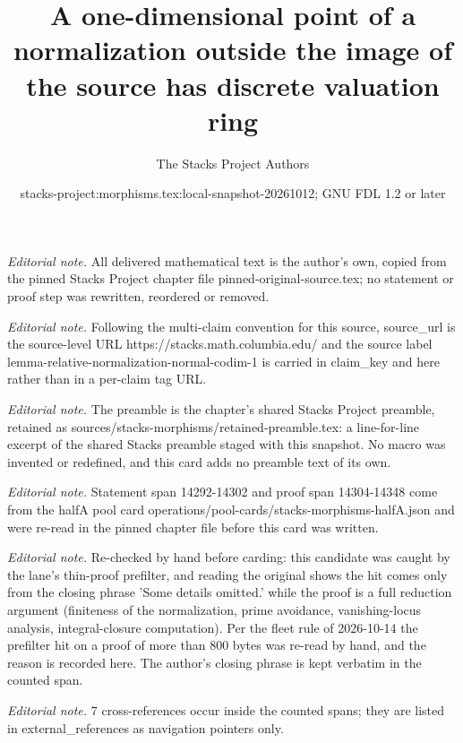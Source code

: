 \documentclass[10pt,a4paper]{amsart}
\title{A one-dimensional point of a normalization outside the image of the source has discrete valuation ring}
\author{The Stacks Project Authors}
\date{stacks-project:morphisms.tex:local-snapshot-20261012; GNU FDL 1.2 or later}
\theoremstyle{plain}
\theoremstyle{definition}
\theoremstyle{remark}
\numberwithin{equation}{subsection}
\begin{document}
\maketitle
\noindent\textit{Editorial note.} All delivered mathematical text is the author's own, copied from the pinned Stacks Project chapter file pinned-original-source.tex; no statement or proof step was rewritten, reordered or removed.\par\medskip
\noindent\textit{Editorial note.} Following the multi-claim convention for this source, source\_url is the source-level URL https://stacks.math.columbia.edu/ and the source label lemma-relative-normalization-normal-codim-1 is carried in claim\_key and here rather than in a per-claim tag URL.\par\medskip
\noindent\textit{Editorial note.} The preamble is the chapter's shared Stacks Project preamble, retained as sources/stacks-morphisms/retained-preamble.tex: a line-for-line excerpt of the shared Stacks preamble staged with this snapshot. No macro was invented or redefined, and this card adds no preamble text of its own.\par\medskip
\noindent\textit{Editorial note.} Statement span 14292-14302 and proof span 14304-14348 come from the halfA pool card operations/pool-cards/stacks-morphisms-halfA.json and were re-read in the pinned chapter file before this card was written.\par\medskip
\noindent\textit{Editorial note.} Re-checked by hand before carding: this candidate was caught by the lane's thin-proof prefilter, and reading the original shows the hit comes only from the closing phrase 'Some details omitted.' while the proof is a full reduction argument (finiteness of the normalization, prime avoidance, vanishing-locus analysis, integral-closure computation). Per the fleet rule of 2026-10-14 the prefilter hit on a proof of more than 800 bytes was re-read by hand, and the reason is recorded here. The author's closing phrase is kept verbatim in the counted span.\par\medskip
\noindent\textit{Editorial note.} 7 cross-references occur inside the counted spans; they are listed in external\_references as navigation pointers only.\par\medskip
\end{document}
